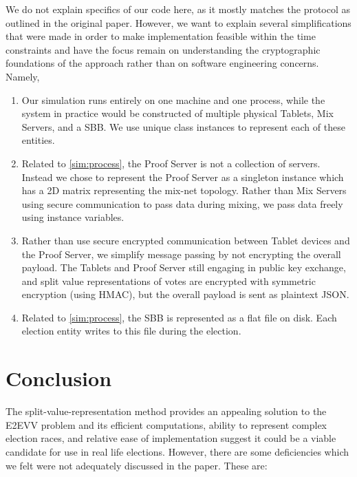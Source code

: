 \documentclass{article}
\begin{document}
We do not explain specifics of our code here, as it mostly matches the protocol as outlined in the original paper. However, we want to explain several simplifications that were made in order to make implementation feasible within the time constraints and have the focus remain on understanding the cryptographic foundations of the approach rather than on software engineering concerns. Namely,
\begin{enumerate}
\item \label{sim:process}
    Our simulation runs entirely on one machine and one process, while the system in practice would be constructed of multiple physical Tablets, Mix Servers, and a SBB. We use unique class instances to represent each of these entities.
\item
    Related to \ref{sim:process}, the Proof Server is not a collection of servers. Instead we chose to represent the Proof Server as a singleton instance which has a 2D matrix representing the mix-net topology. Rather than Mix Servers using secure communication to pass data during mixing, we pass data freely using instance variables.
\item
    Rather than use secure encrypted communication between Tablet devices and the Proof Server, we simplify message passing by not encrypting the overall payload. The Tablets and Proof Server still engaging in public key exchange, and split value representations of votes are encrypted with symmetric encryption (using HMAC), but the overall payload is sent as plaintext JSON.
\item
    Related to \ref{sim:process}, the SBB is represented as a flat file on disk. Each election entity writes to this file during the election.
\end{enumerate}

\section{Conclusion}
The split-value-representation method provides an appealing solution to the E2EVV problem and its efficient computations, ability to represent complex election races, and relative ease of implementation suggest it could be a viable candidate for use in real life elections. However, there are some deficiencies which we felt were not adequately discussed in the paper. These are:
\end{document}
